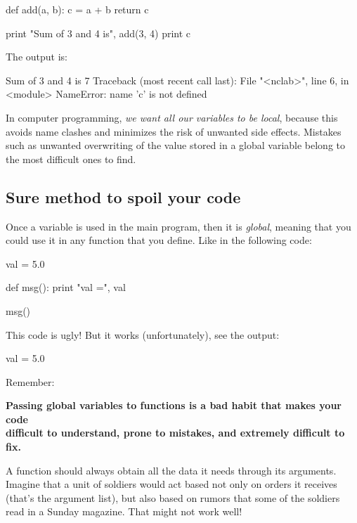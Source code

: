 \begin{bluecode}
def add(a, b):
    c = a + b
    return c

print "Sum of 3 and 4 is", add(3, 4)
print c
\end{bluecode}
The output is:

\begin{redcode}
Sum of 3 and 4 is 7
Traceback (most recent call last):
  File "<nclab>", line 6, in <module>
NameError: name 'c' is not defined
\end{redcode}
In computer programming, {\em we want all our variables to be local}, because 
this avoids name clashes and minimizes the risk of unwanted side effects.
Mistakes such as unwanted overwriting of the value stored in a global variable 
belong to the most difficult ones to find.

\subsection{Sure method to spoil your code}

Once a variable is used in the main program, 
then it is {\em global}, meaning that you could use it in 
any function that you define. Like in the following 
code:

\begin{bluecode}
val = 5.0

def msg():
    print "val =", val

msg()
\end{bluecode}
This code is ugly! But it works (unfortunately), see the output:

\begin{greencode}
val = 5.0
\end{greencode}
Remember:\\

\begin{center}
{\color{red}\bf Passing global variables to functions is a bad habit that makes your code\\
     difficult to understand, prone to mistakes, and extremely difficult to fix.}
\end{center}


\vspace{4mm}
\noindent
A function should always
obtain all the data it needs through its arguments. Imagine that a unit of soldiers 
would act based not only on orders it receives (that's the argument 
list), but also based on rumors that some of the soldiers read in a Sunday magazine. 
That might not work well!\\

